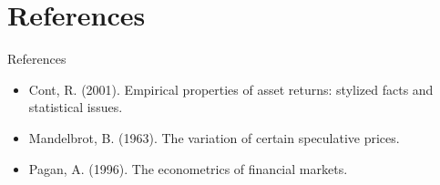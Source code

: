 \documentclass[9pt, aspectratio=169, t]{beamer}
\theoremstyle{definition}
\begin{document}
\section{References}

\begin{frame}{References}
    \begin{itemize}
        \item Cont, R. (2001). Empirical properties of asset returns: stylized facts and statistical issues.
        \item Mandelbrot, B. (1963). The variation of certain speculative prices.
        \item Pagan, A. (1996). The econometrics of financial markets.
    \end{itemize}
\end{frame}
\end{document}
